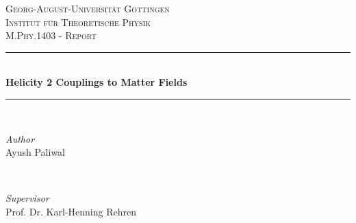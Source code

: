 \documentclass[12pt,a4paper]{article}
\author{}
\date{}
\numberwithin{equation}{section}
\begin{document}

\begin{titlepage} %
	\newcommand{\HRule}{\rule{\linewidth}{0.5mm}} %
	
	\center %
	
	
	\textsc{\LARGE Georg-August-Universität Göttingen}\\[1.5cm] %
	
	\textsc{\Large Institut für Theoretische Physik
}\\[0.5cm] %
	
	\textsc{\large M.Phy.1403 - Report}\\[0.5cm] %
	
	
	\HRule\\[0.4cm]
	
	{\huge\bfseries Helicity 2 Couplings to Matter Fields}\\[0.4cm] %
	
	\HRule\\[1.5cm]
	
	
	\begin{minipage}{0.4\textwidth}
		\begin{flushleft}
			\large
			\textit{Author}\\
			Ayush Paliwal %
		\end{flushleft}
	\end{minipage}
	~
	\begin{minipage}{0.4\textwidth}
		\begin{flushright}
			\large
			\textit{Supervisor}\\
			Prof. Dr. Karl-Henning Rehren %
		\end{flushright}
	\end{minipage}
	

\end{titlepage}
\end{document}
